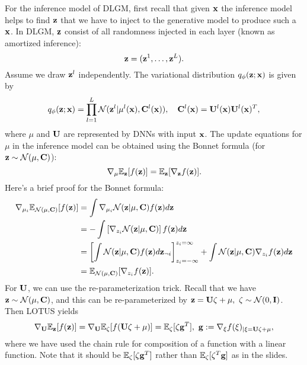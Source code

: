 \documentclass[../main.tex]{subfiles}
\begin{document}
\par For the inference model of DLGM, first recall that given ${\bf x}$ the inference model helps to find ${\bf z}$ that we have to inject to the generative model to produce such a ${\bf x}$. In DLGM, ${\bf z}$ consist of all randomness injected in each layer (known as amortized inference):
\begin{equation*}
{\bf z} =({\bf z}^1,\dots,{\bf z}^L).
\end{equation*}
Assume we draw ${\bf z}^l$ independently. The variational distribution $q_\phi({\bf z};{\bf x})$ is given by
\begin{equation*}
q_\phi({\bf z};{\bf x})=\prod_{l=1}^{L}\mathcal{N}({\bf z}^l|\mu^l({\bf x}),{\bf C}^l({\bf x})),\quad {\bf C}^l({\bf x})={\bf U}^l({\bf x}){\bf U}^l({\bf x})^T,
\end{equation*}
where $\mu$ and $\bf U$ are represented by DNNs with input $\bf x$. The update equations for $\mu$ in the inference model can be obtained using the Bonnet formula (for ${\bf z}\sim \mathcal{N}(\mu,{\bf C})$):
\begin{equation*}
\nabla_\mu\mathbb{E}_{\bf z}[f({\bf z})]=\mathbb{E}_{\bf z}[\nabla_{\bf z} f({\bf z})].
\end{equation*}
Here's a brief proof for the Bonnet formula:
\begin{align*}
\nabla_{\mu_i}\mathbb{E}_{\mathcal{N}(\mu,{\bf C})}[f({\bf z})] &= \int  \nabla_{\mu_i} \mathcal{N}({\bf z}|\mu,{\bf C}) f({\bf z}) d{\bf z}\\
&=-\int \left[\nabla_{z_i}\mathcal{N}({\bf z}|\mu,{\bf C})\right] f({\bf z}) d{\bf z}\\
&=\left[\int\mathcal{N}({\bf z}|\mu,{\bf C}) f({\bf z}) d{\bf z}_{\neg i} \right]_{z_i=-\infty}^{z_i=\infty}+ \int \mathcal{N}({\bf z}|\mu,{\bf C}) \nabla_{z_i} f({\bf z}) d{\bf z}\\
&=\mathbb{E}_{\mathcal{N}(\mu,{\bf C})}[\nabla_{z_i}f({\bf z})].
\end{align*}
For ${\bf U}$, we can use the re-parameterization trick. Recall that we have ${\bf z}\sim \mathcal{N}(\mu,{\bf C})$, and this can be re-parameterized by ${\bf z}={\bf U}\zeta +\mu,\ \zeta\sim\mathcal{N}(0,{\bf I})$. Then LOTUS yields
\begin{equation*}
\nabla_{\bf U}\mathbb{E}_{\bf z}[f({\bf z})]=\nabla_{\bf U}\mathbb{E}_\zeta[f({\bf U}\zeta +\mu)]=\mathbb{E}_\zeta[\zeta{\bf g}^T],\ {\bf g}:=\nabla_\xi f(\xi)_{|\xi={\bf U}\zeta+\mu},
\end{equation*}
where we have used the chain rule for composition of a function with a linear function. Note that it should be $\mathbb{E}_\zeta[\zeta{\bf g}^T]$ rather than $\mathbb{E}_\zeta[\zeta^T{\bf g}]$ as in the slides.
\end{document}
